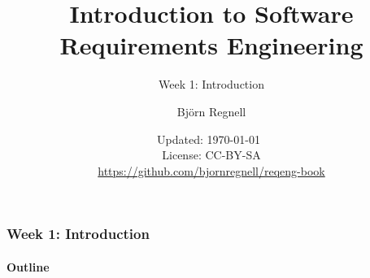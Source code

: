 \documentclass{reqenglecture}
\title{Introduction to Software Requirements Engineering}
\subtitle{Week 1: Introduction}
\author{Björn Regnell}
\date{\vspace{1em}\footnotesize Updated: \today~
\\ License: CC-BY-SA 
\\ \url{https://github.com/bjornregnell/reqeng-book} 
}
\begin{document}
\maketitle

\begin{frame}
\frametitle{Week 1: Introduction}
\framesubtitle{Outline}
\tableofcontents
\end{frame}















\end{document}
